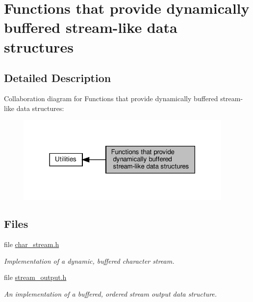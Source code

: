 \hypertarget{group__buffer__utils}{}\section{Functions that provide dynamically buffered stream-\/like data structures}
\label{group__buffer__utils}


\subsection{Detailed Description}
Collaboration diagram for Functions that provide dynamically buffered stream-\/like data structures\+:
\nopagebreak
\begin{figure}[H]
\begin{center}
\leavevmode
\includegraphics[width=302pt]{group__buffer__utils}
\end{center}
\end{figure}
\subsection*{Files}
\begin{DoxyCompactItemize}
\item 
file \hyperlink{char__stream_8h}{char\+\_\+stream.\+h}
\begin{DoxyCompactList}\small\item\em Implementation of a dynamic, buffered character stream. \end{DoxyCompactList}\item 
file \hyperlink{stream__output_8h}{stream\+\_\+output.\+h}
\begin{DoxyCompactList}\small\item\em An implementation of a buffered, ordered stream output data structure. \end{DoxyCompactList}\end{DoxyCompactItemize}
